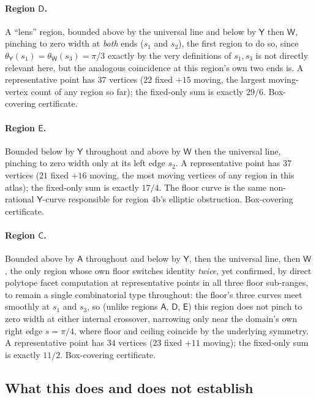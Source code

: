 \documentclass[11pt,reqno]{amsart}
\renewcommand{\_}{\origunderscore\allowbreak}
\numberwithin{equation}{section}
\theoremstyle{plain}
\theoremstyle{definition}
\theoremstyle{remark}
\newcommand{\arcp}{s}                        %
\begin{document}
\paragraph{Region $\mathsf D$.} A ``lens'' region, bounded above by the
universal line and below by $\mathsf Y$ then $\mathsf W$, pinching to
zero width at \emph{both} ends ($\arcp_1$ and $\arcp_2$), the first
region to do so, since $\theta_{\mathsf Y}(\arcp_1)=\theta_{\mathsf W}(\arcp_3)=\pi/3$
exactly by the very definitions of $\arcp_1,\arcp_3$ is not directly
relevant here, but the analogous coincidence at this region's own two
ends is. A representative point has $37$ vertices ($22$ fixed $+15$
moving, the largest moving-vertex count of any region so far); the
fixed-only sum is exactly $29/6$. Box-covering certificate.

\paragraph{Region $\mathsf E$.} Bounded below by $\mathsf Y$ throughout
and above by $\mathsf W$ then the universal line, pinching to zero
width only at its left edge $\arcp_2$. A representative point has $37$
vertices ($21$ fixed $+16$ moving, the most moving vertices of any
region in this atlas); the fixed-only sum is exactly $17/4$. The floor
curve is the same non-rational $\mathsf Y$-curve responsible for region
$4$b's elliptic obstruction. Box-covering certificate.

\paragraph{Region $\mathsf C$.} Bounded above by $\mathsf A$ throughout
and below by $\mathsf Y$, then the universal line, then $\mathsf W$, 
the only region whose own floor switches identity \emph{twice}, yet
confirmed, by direct polytope facet computation at representative
points in all three floor sub-ranges, to remain a single combinatorial
type throughout: the floor's three curves meet smoothly at $\arcp_1$
and $\arcp_3$, so (unlike regions $\mathsf A$, $\mathsf D$, $\mathsf E$)
this region does not pinch to zero width at either internal crossover,
narrowing only near the domain's own right edge $\arcp=\pi/4$, where
floor and ceiling coincide by the underlying symmetry. A representative
point has $34$ vertices ($23$ fixed $+11$ moving); the fixed-only sum
is exactly $11/2$. Box-covering certificate.

\subsection{What this does and does not establish}
\end{document}
